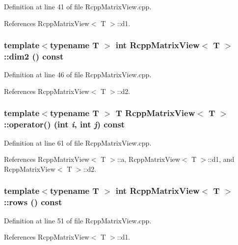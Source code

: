 Definition at line 41 of file RcppMatrixView.cpp.

References RcppMatrixView$<$ T $>$::d1.\hypertarget{classRcppMatrixView_aebb7f65646ce780c897dc39f31899439}{
\subsubsection[{dim2}]{\setlength{\rightskip}{0pt plus 5cm}template$<$typename T $>$ int {\bf RcppMatrixView}$<$ T $>$::dim2 () const}}
\label{classRcppMatrixView_aebb7f65646ce780c897dc39f31899439}


Definition at line 46 of file RcppMatrixView.cpp.

References RcppMatrixView$<$ T $>$::d2.\hypertarget{classRcppMatrixView_ad135a7e855eee55b078807766aff9e96}{
\subsubsection[{operator()}]{\setlength{\rightskip}{0pt plus 5cm}template$<$typename T $>$ T {\bf RcppMatrixView}$<$ T $>$::operator() (int {\em i}, \/  int {\em j}) const}}
\label{classRcppMatrixView_ad135a7e855eee55b078807766aff9e96}


Definition at line 61 of file RcppMatrixView.cpp.

References RcppMatrixView$<$ T $>$::a, RcppMatrixView$<$ T $>$::d1, and RcppMatrixView$<$ T $>$::d2.\hypertarget{classRcppMatrixView_aa9760806a822cd988264e1dbdc1f6c37}{
\subsubsection[{rows}]{\setlength{\rightskip}{0pt plus 5cm}template$<$typename T $>$ int {\bf RcppMatrixView}$<$ T $>$::rows () const}}
\label{classRcppMatrixView_aa9760806a822cd988264e1dbdc1f6c37}


Definition at line 51 of file RcppMatrixView.cpp.

References RcppMatrixView$<$ T $>$::d1.

